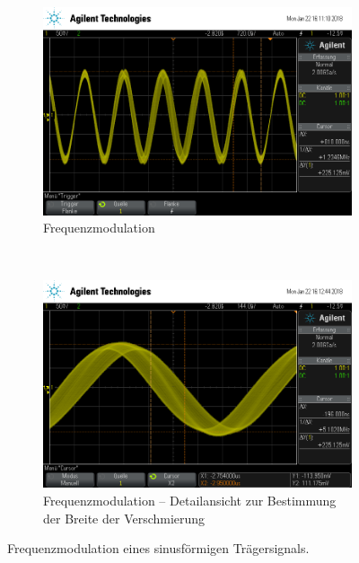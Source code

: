 \begin{figure}[t!]
	\centering
	\begin{subfigure}[t]{0.5\textwidth}
		\centering
		\includegraphics[width=\textwidth]{img/d_scope_233.png}
		\caption{Frequenzmodulation}
	\end{subfigure}%
	~
	\begin{subfigure}[t]{0.5\textwidth}
		\centering
		\includegraphics[width=\textwidth]{img/d_scope_234.png}
		\caption{Frequenzmodulation -- Detailansicht zur Bestimmung der Breite der Verschmierung}
	\end{subfigure}
	\caption{Frequenzmodulation eines sinusförmigen Trägersignals.}
	\label{d1}
\end{figure}

